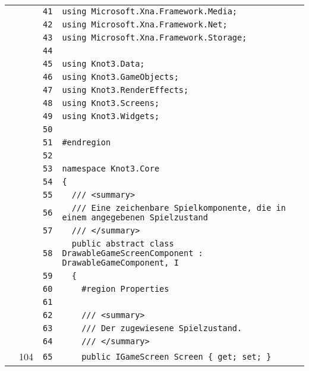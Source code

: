 \documentclass[a4paper,10pt]{article}
\begin{document}
\begin{longtable}[l]{lrrl}
\cellcolor{gray} &  & \verb~41~ & \verb~using Microsoft.Xna.Framework.Media;~\\
\cellcolor{gray} &  & \verb~42~ & \verb~using Microsoft.Xna.Framework.Net;~\\
\cellcolor{gray} &  & \verb~43~ & \verb~using Microsoft.Xna.Framework.Storage;~\\
\cellcolor{gray} &  & \verb~44~ & \verb~~\\
\cellcolor{gray} &  & \verb~45~ & \verb~using Knot3.Data;~\\
\cellcolor{gray} &  & \verb~46~ & \verb~using Knot3.GameObjects;~\\
\cellcolor{gray} &  & \verb~47~ & \verb~using Knot3.RenderEffects;~\\
\cellcolor{gray} &  & \verb~48~ & \verb~using Knot3.Screens;~\\
\cellcolor{gray} &  & \verb~49~ & \verb~using Knot3.Widgets;~\\
\cellcolor{gray} &  & \verb~50~ & \verb~~\\
\cellcolor{gray} &  & \verb~51~ & \verb~#endregion~\\
\cellcolor{gray} &  & \verb~52~ & \verb~~\\
\cellcolor{gray} &  & \verb~53~ & \verb~namespace Knot3.Core~\\
\cellcolor{gray} &  & \verb~54~ & \verb~{~\\
\cellcolor{gray} &  & \verb~55~ & \verb~  /// <summary>~\\
\cellcolor{gray} &  & \verb~56~ & \verb~  /// Eine zeichenbare Spielkomponente, die in einem angegebenen Spielzustand ~\\
\cellcolor{gray} &  & \verb~57~ & \verb~  /// </summary>~\\
\cellcolor{gray} &  & \verb~58~ & \verb~  public abstract class DrawableGameScreenComponent : DrawableGameComponent, I~\\
\cellcolor{gray} &  & \verb~59~ & \verb~  {~\\
\cellcolor{gray} &  & \verb~60~ & \verb~    #region Properties~\\
\cellcolor{gray} &  & \verb~61~ & \verb~~\\
\cellcolor{gray} &  & \verb~62~ & \verb~    /// <summary>~\\
\cellcolor{gray} &  & \verb~63~ & \verb~    /// Der zugewiesene Spielzustand.~\\
\cellcolor{gray} &  & \verb~64~ & \verb~    /// </summary>~\\
\cellcolor{green} & 104 & \verb~65~ & \verb~    public IGameScreen Screen { get; set; }~\\

\end{longtable}
\end{document}
